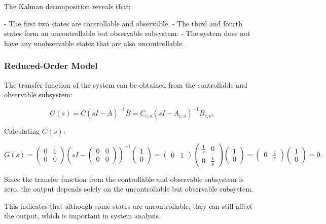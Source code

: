 \documentclass{article}
\begin{document}
The Kalman decomposition reveals that:

- The first two states are controllable and observable.
- The third and fourth states form an uncontrollable but observable subsystem.
- The system does not have any unobservable states that are also uncontrollable.

\subsubsection{Reduced-Order Model}

The transfer function of the system can be obtained from the controllable and observable subsystem:

\[
G(s) = \bar{C}(sI - \bar{A})^{-1} \bar{B} = C_{c,o}(sI - A_{c,o})^{-1} B_{c,o}.
\]

Calculating \( G(s) \):

\[
G(s) = \begin{pmatrix}
0 & 1 \\
0 & 0
\end{pmatrix}
\left( sI - \begin{pmatrix}
0 & 0 \\
0 & 0
\end{pmatrix} \right)^{-1}
\begin{pmatrix}
1 \\
0
\end{pmatrix}
= \begin{pmatrix}
0 & 1
\end{pmatrix}
\begin{pmatrix}
\frac{1}{s} & 0 \\
0 & \frac{1}{s}
\end{pmatrix}
\begin{pmatrix}
1 \\
0
\end{pmatrix}
= \begin{pmatrix}
0 & \frac{1}{s}
\end{pmatrix}
\begin{pmatrix}
1 \\
0
\end{pmatrix}
= 0.
\]

Since the transfer function from the controllable and observable subsystem is zero, the output depends solely on the uncontrollable but observable subsystem.

This indicates that although some states are uncontrollable, they can still affect the output, which is important in system analysis.
\end{document}
